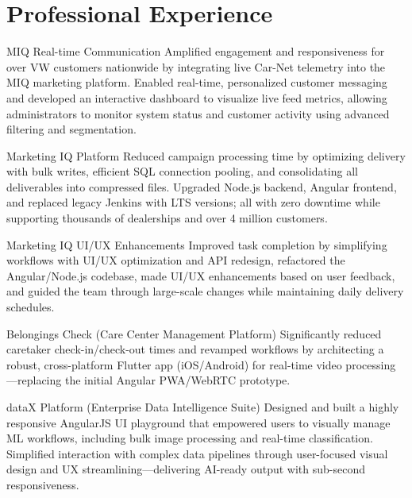 \section{Professional Experience}

\begin{sectionContainer}
	{MIQ Real-time Communication} {Amplified engagement and responsiveness for over VW customers nationwide by integrating live Car-Net telemetry into the MIQ marketing platform. Enabled real-time, personalized customer messaging and developed an interactive dashboard to visualize live feed metrics, allowing administrators to monitor system status and customer activity using advanced filtering and segmentation.}
\end{sectionContainer}

\begin{sectionContainer}
	{Marketing IQ Platform} {Reduced campaign processing time by optimizing delivery with bulk writes, efficient SQL connection pooling, and consolidating all deliverables into compressed files. Upgraded Node.js backend, Angular frontend, and replaced legacy Jenkins with LTS versions; all with zero downtime while supporting thousands of dealerships and over 4 million customers.}
\end{sectionContainer}

\begin{sectionContainer}
	{Marketing IQ UI/UX Enhancements} {Improved task completion by simplifying workflows with UI/UX optimization and API redesign, refactored the Angular/Node.js codebase, made UI/UX enhancements based on user feedback, and guided the team through large-scale changes while maintaining daily delivery schedules.}
\end{sectionContainer}


\begin{sectionContainer}
	{Belongings Check (Care Center Management Platform)} {Significantly reduced caretaker check-in/check-out times and revamped workflows by architecting a robust, cross-platform Flutter app (iOS/Android) for real-time video processing—replacing the initial Angular PWA/WebRTC prototype.}
\end{sectionContainer}

\begin{sectionContainer}
	{dataX Platform (Enterprise Data Intelligence Suite)} {Designed and built a highly responsive AngularJS UI playground that empowered users to visually manage ML workflows, including bulk image processing and real-time classification. Simplified interaction with complex data pipelines through user-focused visual design and UX streamlining—delivering AI-ready output with sub-second responsiveness.}
\end{sectionContainer}

